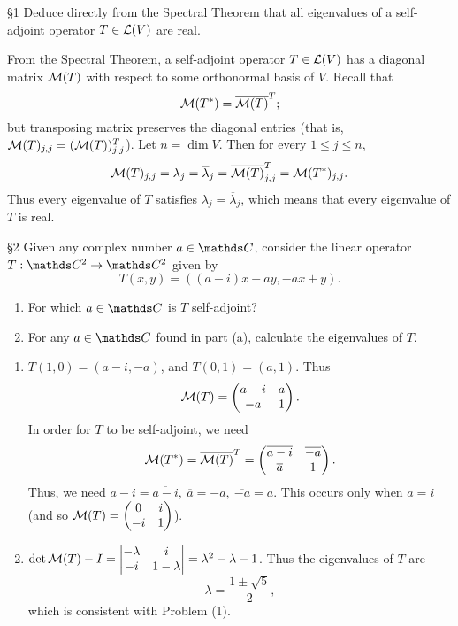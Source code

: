 \documentclass{review-sheet}
\begin{document}
\begin{problem}{\S 1}
  Deduce directly from the Spectral Theorem that all eigenvalues of a self-adjoint operator $T\in
  \mathcal{L}(V)$ are real.
\end{problem}
\begin{solution}
  From the Spectral Theorem, a self-adjoint operator $T\in \mathcal{L}(V)$ has a diagonal matrix
  $\mathcal{M}(T)$ with respect to some orthonormal basis of $V$. Recall that \[
    \mathcal{M}(T^*)=\overline{\mathcal{M}(T)}^T
  ;\] but transposing matrix preserves the diagonal entries (that is,
  $\mathcal{M}(T)_{j,j}=(\mathcal{M}(T))^T_{j,j}$). Let $n=\dim{V}$. Then for every $1\le j\le n$, \[
    \mathcal{M}(T)_{j,j}=\lambda_j=\overline{\lambda}_j=\overline{\mathcal{M}(T)}^T_{j,j}=\mathcal{M}(T^*)_{j,j}
  .\] Thus every eigenvalue of $T$ satisfies $\lambda_j=\overline{\lambda}_j$, which means that
  every eigenvalue of $T$ is real.
\end{solution}

\begin{problem}{\S 2}
  Given any complex number $a\in \C$, consider the linear operator $T:\C^2\to \C^2$ given by \[
    T(x,y)=((a-i)x+ay,-ax+y)
  .\] 
  \begin{enumerate}[label=(\alph*)]
    \item For which $a\in \C$ is $T$ self-adjoint?
    \item For any $a\in \C$ found in part (a), calculate the eigenvalues of $T$.
  \end{enumerate}
\end{problem}
\begin{solution}
  \begin{enumerate}[label=(\alph*)]
    \item $T(1,0)=(a-i,-a)$, and $T(0,1)=(a,1)$. Thus \[
        \mathcal{M}(T)=\begin{pmatrix} a-i&a\\-a&1 \end{pmatrix} 
      .\] In order for $T$ to be self-adjoint, we need \[
      \mathcal{M}(T^*)=\overline{\mathcal{M}(T)}^T=\begin{pmatrix}
      \overline{a-i}&\overline{-a}\\\overline{a}&1 \end{pmatrix} 
      .\] Thus, we need $a-i=\overline{a-i},\ \overline{a}=-a,\ \overline{-a}=a$. This occurs only
      when $a=i$ (and so $\mathcal{M}(T)=\begin{pmatrix} 0&i\\-i&1 \end{pmatrix} $).
    \item $\det{\mathcal{M}(T)-I}=\begin{vmatrix} -\lambda&i\\-i&1-\lambda
      \end{vmatrix}=\lambda^2-\lambda-1 $. Thus the eigenvalues of $T$ are \[
        \lambda=\frac{1\pm \sqrt{5}}{2}
      ,\] which is consistent with Problem (1).
  \end{enumerate}
\end{solution}
\end{document}
